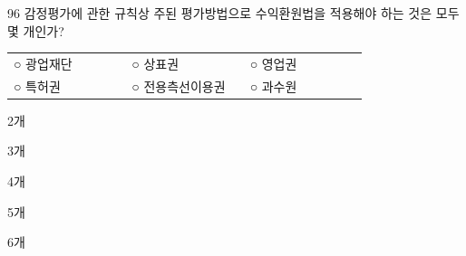 \begin{question}{96}
감정평가에 관한 규칙상 주된 평가방법으로 수익환원법을 적용해야 하는 것은 모두 몇 개인가?
\begin{framedtext}
\begin{tabular}{@{}p{0.3\linewidth}p{0.3\linewidth}p{0.3\linewidth}@{}}
○ 광업재단 & ○ 상표권 & ○ 영업권 \\
○ 특허권 & ○ 전용측선이용권 & ○ 과수원 \\
\end{tabular}
\end{framedtext}
\begin{choices}
  \item 2개
  \item 3개
  \item 4개
  \item 5개
  \item 6개
\end{choices}
\end{question}
